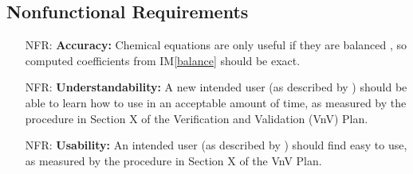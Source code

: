 \documentclass[12pt]{article}
\newcommand{\iref}[1]{IM\ref{#1}}
\newcounter{nfrnum} %
\begin{document}

\subsection{Nonfunctional Requirements} \label{sec_nonfuncReqs}

\begin{itemize}

  \item[NFR\refstepcounter{nfrnum}\thenfrnum \label{NFR_accuracy}:]
    \textbf{Accuracy:} Chemical equations are only useful if they are balanced
    \cite{lund_introduction_2023}, so computed coefficients from \iref{balance}
    should be exact.



  \item[NFR\refstepcounter{nfrnum}\thenfrnum \label{NFR_understandability}:]
    \textbf{Understandability:} A new intended user (as described by
    ) should be able to learn how to use \progname{} in an
    acceptable amount of time, as measured by the procedure in Section X of
    the Verification and Validation (VnV) Plan.

  \item[NFR\refstepcounter{nfrnum}\thenfrnum \label{NFR_usability}:]
    \textbf{Usability:} An intended user (as described by )
    should find \progname{} easy to use, as measured by the procedure in Section X
    of the VnV Plan.


\end{itemize}
\end{document}

